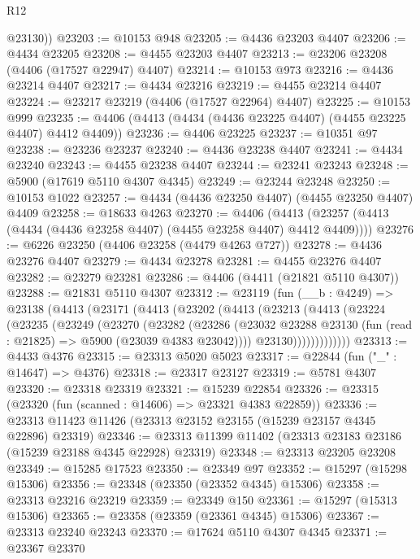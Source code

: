 \begin{lexlean}{R12}
\begin{coremodule}
        @23130))
@23203 := @10153 @948
@23205 := @4436 @23203 @4407
@23206 := @4434 @23205
@23208 := @4455 @23203 @4407
@23213 := @23206 @23208 (@4406 (@17527 @22947) @4407)
@23214 := @10153 @973
@23216 := @4436 @23214 @4407
@23217 := @4434 @23216
@23219 := @4455 @23214 @4407
@23224 := @23217 @23219 (@4406 (@17527 @22964) @4407)
@23225 := @10153 @999
@23235 := @4406 (@4413 (@4434 (@4436 @23225 @4407) (@4455 @23225 @4407) @4412 @4409))
@23236 := @4406 @23225
@23237 := @10351 @97
@23238 := @23236 @23237
@23240 := @4436 @23238 @4407
@23241 := @4434 @23240
@23243 := @4455 @23238 @4407
@23244 := @23241 @23243
@23248 := @5900 (@17619 @5110 @4307 @4345)
@23249 := @23244 @23248
@23250 := @10153 @1022
@23257 := @4434 (@4436 @23250 @4407) (@4455 @23250 @4407) @4409
@23258 := @18633 @4263
@23270 := @4406
    (@4413 (@23257 (@4413 (@4434 (@4436 @23258 @4407) (@4455 @23258 @4407) @4412 @4409))))
@23276 := @6226 @23250 (@4406 @23258 (@4479 @4263 @727))
@23278 := @4436 @23276 @4407
@23279 := @4434 @23278
@23281 := @4455 @23276 @4407
@23282 := @23279 @23281
@23286 := @4406 (@4411 (@21821 @5110 @4307))
@23288 := @21831 @5110 @4307
@23312 := @23119
    (fun (__b : @4249) =>
    @23138
      (@4413
        (@23171
          (@4413
            (@23202
              (@4413
                (@23213
                  (@4413
                    (@23224
                      (@23235
                        (@23249
                          (@23270
                            (@23282
                              (@23286
                                (@23032
                                  @23288
                                  @23130
                                  (fun (read : @21825) => @5900 (@23039 @4383 @23042))))
                              @23130)))))))))))))
@23313 := @4433 @4376
@23315 := @23313 @5020 @5023
@23317 := @22844 (fun ("_" : @14647) => @4376)
@23318 := @23317 @23127
@23319 := @5781 @4307
@23320 := @23318 @23319
@23321 := @15239 @22854
@23326 := @23315 (@23320 (fun (scanned : @14606) => @23321 @4383 @22859))
@23336 := @23313 @11423 @11426 (@23313 @23152 @23155 (@15239 @23157 @4345 @22896) @23319)
@23346 := @23313 @11399 @11402 (@23313 @23183 @23186 (@15239 @23188 @4345 @22928) @23319)
@23348 := @23313 @23205 @23208
@23349 := @15285 @17523
@23350 := @23349 @97
@23352 := @15297 (@15298 @15306)
@23356 := @23348 (@23350 (@23352 @4345) @15306)
@23358 := @23313 @23216 @23219
@23359 := @23349 @150
@23361 := @15297 (@15313 @15306)
@23365 := @23358 (@23359 (@23361 @4345) @15306)
@23367 := @23313 @23240 @23243
@23370 := @17624 @5110 @4307 @4345
@23371 := @23367 @23370

\end{coremodule}
\end{lexlean}
